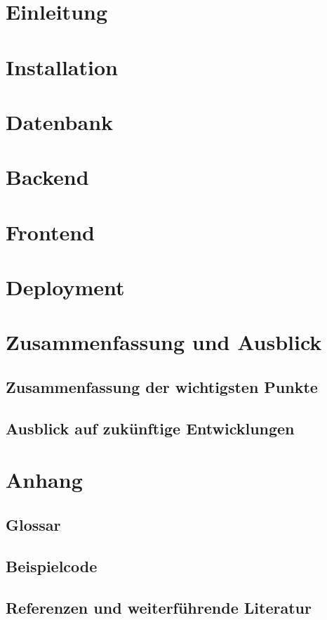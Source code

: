 \documentclass[1.5pt]{article}
\begin{document}
\section{Einleitung}
    

\section{Installation}
    
    
\section{Datenbank}
    

\section{Backend}
    

\section{Frontend}
    

\section{Deployment}
    

\section{Zusammenfassung und Ausblick}
    \subsection{Zusammenfassung der wichtigsten Punkte}
    \subsection{Ausblick auf zukünftige Entwicklungen}

\section{Anhang}
    \subsection{Glossar}
    \subsection{Beispielcode}
    \subsection{Referenzen und weiterführende Literatur}
\label {LetzteSeite}
\end{document}
